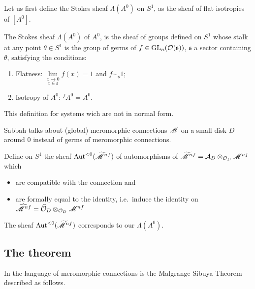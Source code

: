 Let us first define the Stokes sheaf $\Lambda(A^0)$ on $S^1$, as the sheaf of
flat isotropies of $[A^0]$.
\begin{defn}\label{defn:StokesSheaf}
  The Stokes sheaf $\Lambda(A^0)$ of $A^0$, is the sheaf of groups defined on
  $S^1$ whose stalk at any point $\theta\in S^1$ is the group of germs of
  $f\in\operatorname{GL}_n(\mathcal{O}(\mathfrak{s}))$, $\mathfrak{s}$ a sector containing $\theta$,
  satisfying
  the conditions:
  \begin{enumerate}
    \item Flatness: $\underset{x\in\mathfrak{s}}{\underset{x\to0}{\lim}}f(x)=1$
      and $f\sim_{\mathfrak{s}} 1$;
    \item Isotropy of $A^0$: ${}^f\!A^0=A^0$.
  \end{enumerate}
  \begin{s-rem}
    This definition  for systems wich are not in
    normal form.
  \end{s-rem}
  \begin{s-rem}
    Sabbah \cite[110]{sabbah2007isomonodromic} talks about (global) meromorphic
    connections $\mathscr{M}$ on a small disk $D$ around $0$ instead of germs of
    meromorphic connections.

    Define on $S^1$ the sheaf $\operatorname{Aut}^{<0}(\widetilde{\mathscr{M}}^{nf})$ of automorphisms of
    $\widetilde{\mathscr{M}}^{nf}=\mathcal{A}_D\otimes_{\mathcal{O}_D}\mathscr{M}^{nf}$ which
    \begin{itemize}
      \item are compatible with the connection and
      \item are formally equal to the identity, i.e.\ induce the identity on
        $\widehat{\mathscr{M}}^{nf}=\widehat{\mathcal{O}}_D\otimes_{\mathcal{O}_D}\mathscr{M}^{nf}$
    \end{itemize}

    The sheaf $\operatorname{Aut}^{<0}(\widetilde{\mathscr{M}}^{nf})$ corresponds to our $\Lambda(A^0)$.
  \end{s-rem}
\end{defn}

\subsection{The theorem}
In the language of meromorphic connections is the Malgrange-Sibuya Theorem
described as follows.

